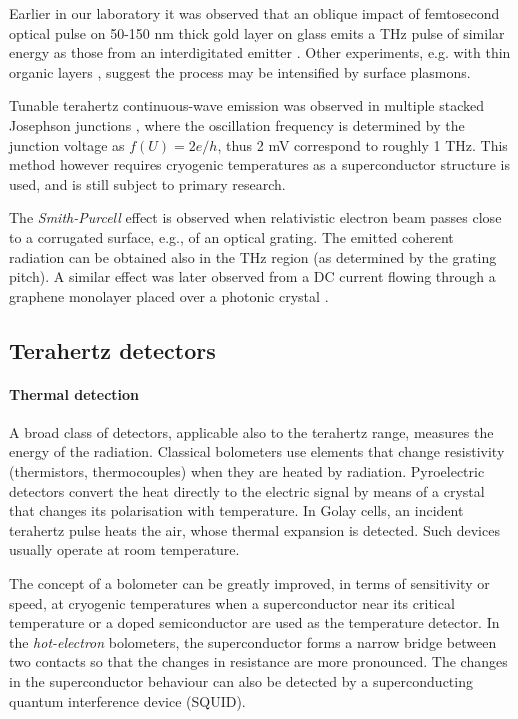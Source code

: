 Earlier in our laboratory it was observed that an oblique impact of femtosecond optical pulse on 50-150 nm thick gold layer on glass emits a THz pulse of similar energy as those from an interdigitated emitter \cite{kadlec2004optical,kadlec2005study}. Other experiments, e.g. with thin organic layers \cite{ramakrishnan2012surface}, suggest the process may be intensified by surface plasmons.

Tunable terahertz continuous-wave emission was observed in multiple stacked Josephson junctions \cite{ozyuzer2007emission}, where the oscillation frequency is determined by the junction voltage as $f(U) = 2e/h$, thus 2 mV correspond to roughly 1 THz. This method however requires cryogenic temperatures as a superconductor structure is used, and is still subject to primary research.

The \textit{Smith-Purcell} effect is observed when relativistic electron beam passes close to a corrugated surface, e.g., of an optical grating. The emitted coherent radiation can be obtained also in the THz region \cite{doucas1992first} (as determined by the grating pitch). A similar effect was later observed from a DC current flowing through a graphene monolayer placed over a photonic crystal \cite{tantiwanichapan2014graphene}.

\subsection{Terahertz detectors}
\paragraph{Thermal detection}%
A broad class of detectors, applicable also to the terahertz range, measures the energy of the radiation. 
Classical bolometers use elements that change resistivity (thermistors, thermocouples) when they are heated by radiation.
Pyroelectric detectors convert the heat directly to the electric signal by means of a crystal that changes its polarisation with temperature. In Golay cells, an incident terahertz pulse heats the air, whose thermal expansion is detected. Such devices usually operate at room temperature.

The concept of a bolometer can be greatly improved, in terms of sensitivity or speed, at cryogenic temperatures when a superconductor near its critical temperature or a doped semiconductor are used as the temperature detector. In the \textit{hot-electron} bolometers, the superconductor forms a narrow bridge between two contacts so that the changes in resistance are more pronounced. The changes in the superconductor behaviour can also be detected by a superconducting quantum interference device (SQUID).  

